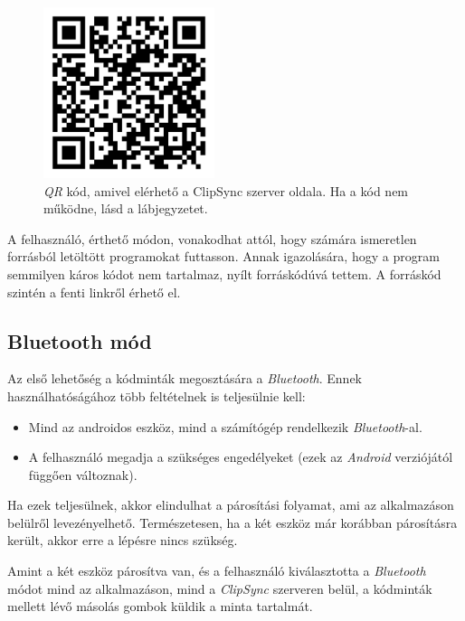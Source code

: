 \documentclass[12pt,a4paper]{article}
\begin{document}
	\begin{figure}[h!]
		\centering
		\includegraphics[width=5cm]{clipsync_server_qr}
		\caption[ClipSync szerver caption.]{\textit{QR} kód, amivel elérhető a ClipSync szerver oldala. Ha a kód nem működne, lásd a lábjegyzetet\footnotemark.}
		\label{qr_clipsync}
	\end{figure}

	A felhasználó, érthető módon, vonakodhat attól, hogy számára ismeretlen forrásból letöltött programokat futtasson. Annak igazolására, hogy a program semmilyen káros kódot nem tartalmaz, nyílt forráskódúvá tettem. A forráskód szintén a fenti linkről érhető el.
	
	\subsection{Bluetooth mód}
	
	Az első lehetőség a kódminták megosztására a \textit{Bluetooth}. Ennek használhatóságához több feltételnek is teljesülnie kell:
	
	\begin{itemize}
		\item Mind az androidos eszköz, mind a számítógép rendelkezik \textit{Bluetooth}-al.
		\item A felhasználó megadja a szükséges engedélyeket (ezek az \textit{Android} verziójától függően változnak).
	\end{itemize}

	Ha ezek teljesülnek, akkor elindulhat a párosítási folyamat, ami az alkalmazáson belülről levezényelhető. Természetesen, ha a két eszköz már korábban párosításra 
	került, akkor erre a lépésre nincs szükség.
	
	Amint a két eszköz párosítva van, és a felhasználó kiválasztotta a \textit{Bluetooth} módot mind az alkalmazáson, mind a \textit{ClipSync} szerveren belül, a kódminták mellett lévő másolás gombok küldik a minta tartalmát.
	
\end{document}
